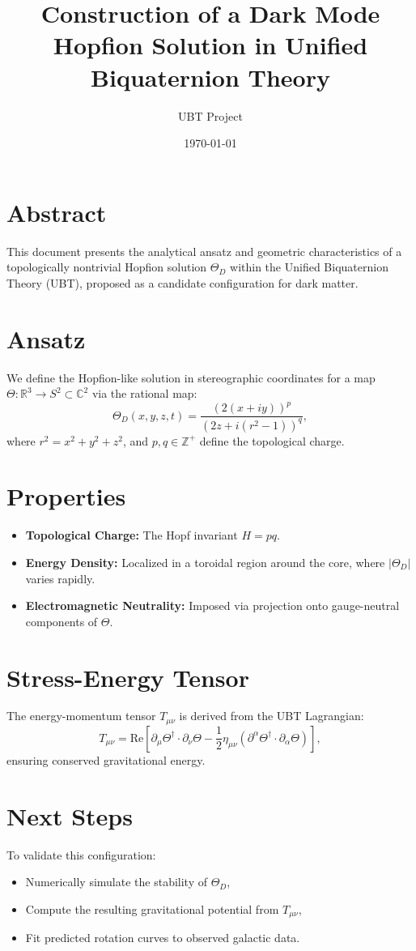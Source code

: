 \documentclass[12pt]{article}
\title{Construction of a Dark Mode Hopfion Solution in Unified Biquaternion Theory}
\author{UBT Project}
\date{\today}
\begin{document}
\maketitle

\section*{Abstract}
This document presents the analytical ansatz and geometric characteristics of a topologically nontrivial Hopfion solution \(\Theta_D\) within the Unified Biquaternion Theory (UBT), proposed as a candidate configuration for dark matter.

\section{Ansatz}
We define the Hopfion-like solution in stereographic coordinates for a map \( \Theta : \mathbb{R}^3 \to S^2 \subset \mathbb{C}^2 \) via the rational map:
\[
\Theta_D(x, y, z, t) = \frac{(2(x+iy))^p}{(2z + i(r^2 - 1))^q},
\]
where \( r^2 = x^2 + y^2 + z^2 \), and \(p, q \in \mathbb{Z}^+\) define the topological charge.

\section{Properties}
\begin{itemize}
    \item \textbf{Topological Charge:} The Hopf invariant \(H = pq\).
    \item \textbf{Energy Density:} Localized in a toroidal region around the core, where \(|\Theta_D|\) varies rapidly.
    \item \textbf{Electromagnetic Neutrality:} Imposed via projection onto gauge-neutral components of \(\Theta\).
\end{itemize}

\section{Stress-Energy Tensor}
The energy-momentum tensor \(T_{\mu\nu}\) is derived from the UBT Lagrangian:
\[
T_{\mu\nu} = \text{Re} \left[ \partial_\mu \Theta^\dagger \cdot \partial_\nu \Theta - \frac{1}{2} \eta_{\mu\nu} \left( \partial^\alpha \Theta^\dagger \cdot \partial_\alpha \Theta \right) \right],
\]
ensuring conserved gravitational energy.

\section{Next Steps}
To validate this configuration:
\begin{itemize}
    \item Numerically simulate the stability of \(\Theta_D\),
    \item Compute the resulting gravitational potential from \(T_{\mu\nu}\),
    \item Fit predicted rotation curves to observed galactic data.
\end{itemize}
\end{document}
